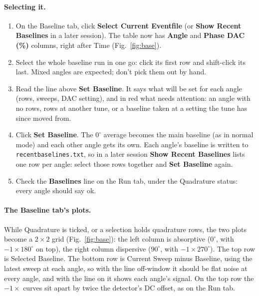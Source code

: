 \documentclass[11pt]{article}
\newcommand{\code}[1]{\texttt{\begingroup\def\_{\textunderscore\allowbreak}#1\endgroup}}
\newcommand{\btn}[1]{\textsf{\textbf{#1}}}   %
\begin{document}
\paragraph{Selecting it.}
\begin{enumerate}
\item On the Baseline tab, click \btn{Select Current Eventfile} (or \btn{Show Recent Baselines} in a later session).
  The table now has \textbf{Angle} and \textbf{Phase DAC (\%)} columns, right after Time (Fig.~\ref{fig:base}).
\item Select the whole baseline run in one go: click its first row and shift-click its last. Mixed angles are
  expected; don't pick them out by hand.
\item Read the line above \btn{Set Baseline}. It says what will be set for each angle (rows, sweeps, DAC
  setting), and in red what needs attention: an angle with no rows, rows at another tune, or a baseline taken at a
  setting the tune has since moved from.
\item Click \btn{Set Baseline}. The $0^\circ$ average becomes the main baseline (as in normal mode) and each other
  angle gets its own. Each angle's baseline is written to \code{recent\_baselines.txt}, so in a later session
  \btn{Show Recent Baselines} lists one row per angle: select those rows together and \btn{Set Baseline} again.
\item Check the \textbf{Baselines} line on the Run tab, under the Quadrature status: every angle should say ok.
\end{enumerate}

\paragraph{The Baseline tab's plots.} While Quadrature is ticked, or a selection holds quadrature rows, the two
plots become a $2\times2$ grid (Fig.~\ref{fig:base}): the left column is absorptive ($0^\circ$, with $-1\times180^\circ$
on top), the right column dispersive ($90^\circ$, with $-1\times270^\circ$). The top row is Selected Baseline. The
bottom row is Current Sweep minus Baseline, using the latest sweep at each angle, so with the line off-window it
should be flat noise at every angle, and with the line on it shows each angle's signal. On the top row the
$-1\times$ curves sit apart by twice the detector's DC offset, as on the Run tab.
\end{document}
